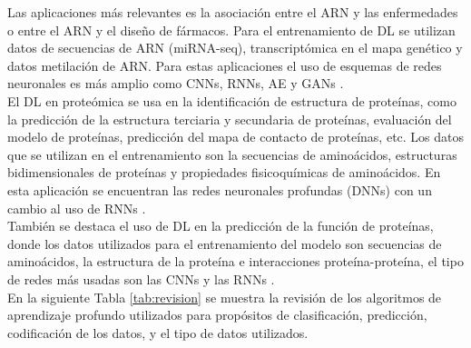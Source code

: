 Las aplicaciones más relevantes es la asociación entre el ARN y las enfermedades o entre el ARN y el diseño de fármacos. Para el entrenamiento de DL se utilizan datos de secuencias de ARN (miRNA-seq), transcriptómica en el mapa genético y datos metilación de ARN. Para estas aplicaciones el uso de esquemas de redes neuronales es más amplio como CNNs, RNNs, AE y GANs \citep{chaudhary2018deep,yu2018drug,aliper2016deep,bhat2016deepcancer}.\\

El DL en proteómica se usa en la identificación de estructura de proteínas, como la predicción de la estructura terciaria y secundaria de proteínas, evaluación del modelo de proteínas, predicción del mapa de contacto de proteínas, etc. Los datos que se utilizan en el entrenamiento son la secuencias de aminoácidos, estructuras bidimensionales de proteínas y propiedades fisicoquímicas de aminoácidos. En esta aplicación se encuentran las redes neuronales profundas (DNNs) con un cambio al uso de RNNs \citep{stahl2017epsilon,li2017deep,spencer2014deep,heffernan2015improving}.\\

También se destaca el uso de DL en la predicción de la función de proteínas, donde los datos utilizados para el entrenamiento del modelo son secuencias de aminoácidos, la estructura de la proteína e interacciones proteína-proteína, el tipo de redes más usadas son las CNNs y las RNNs \citep{kulmanov2018deepgo,wang2017musitedeep}.\\

En la siguiente Tabla \ref{tab:revision} se muestra la revisión de los algoritmos de aprendizaje profundo utilizados para propósitos de clasificación, predicción, codificación de los datos, y el tipo de datos utilizados.\\

